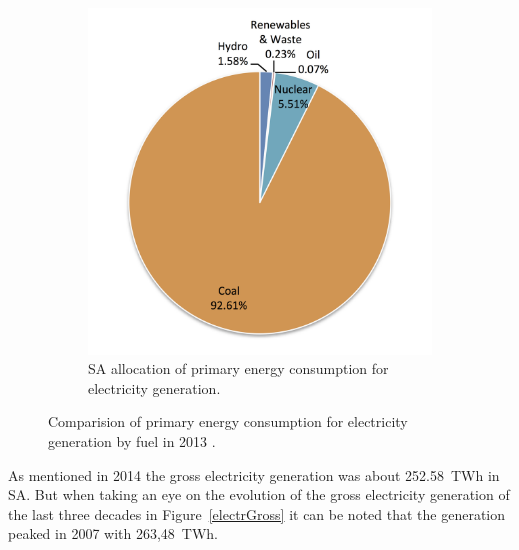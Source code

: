 \begin{figure}[!htbp]
\begin{subfigure}[b]{0.45\textwidth}
                \includegraphics[width=1\textwidth]{FIG/ElectrSA}
                \caption{SA allocation of primary energy consumption for electricity generation.}\label{ElectrSA}
        \end{subfigure}
\caption[Comparision of primary energy consumption for electricity generation by fuel in 2013.]{Comparision of primary energy consumption for electricity generation by fuel in 2013 \cite{Agency2015}.}\label{Electr}
\end{figure}
As mentioned in 2014 the gross electricity generation was about 252.58~TWh in SA. But when taking an eye on the evolution of the gross electricity generation of the last three decades in Figure~\ref{electrGross} it can be noted that the generation peaked in 2007 with 263,48~TWh. \cite{BP2015c} 


